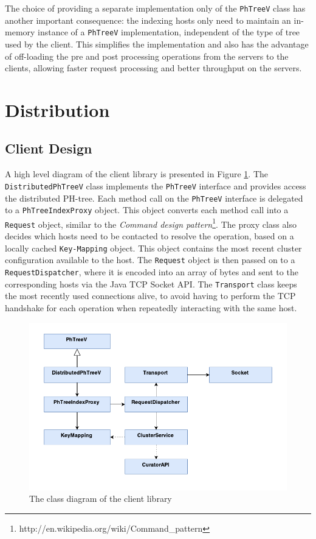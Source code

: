 \documentclass[11pt,a4paper]{globis-book}
\begin{document}
The choice of providing a separate implementation only of the \texttt{PhTreeV} class has another important consequence: the indexing hosts only need to maintain an in-memory instance of a \texttt{PhTreeV} implementation, independent of the type of tree used by the client. This simplifies the implementation and also has the advantage of off-loading the pre and post processing operations from the servers to the clients, allowing faster request processing and better throughput on the servers. 

\section{Distribution}

\subsection{Client Design}

A high level diagram of the client library is presented in Figure \ref{fig:Client-library}. The \texttt{DistributedPhTreeV} class implements the \texttt{PhTreeV} interface and provides access the distributed PH-tree. Each method call on the \texttt{PhTreeV} interface is delegated to a \texttt{PhTreeIndexProxy} object. This object converts each method call into a \texttt{Request} object, similar to the \textit{Command design pattern}\footnote{http://en.wikipedia.org/wiki/Command\_pattern}. The proxy class also decides which hosts need to be contacted to resolve the operation, based on a locally cached \texttt{Key-Mapping} object. This object contains the most recent cluster configuration available to the host. The \texttt{Request} object is then passed on to a \texttt{RequestDispatcher}, where it is encoded into an array of bytes and sent to the corresponding hosts via the Java TCP Socket API. The \texttt{Transport} class keeps the most recently used connections alive, to avoid having to perform the TCP handshake for each operation when repeatedly interacting with the same host. 

\begin{figure}[h]
    \centering 
    \includegraphics[scale=0.9]{images/Client}
    \caption{The class diagram of the client library}
    \label{fig:Client-library}
\end{figure}
\end{document}
